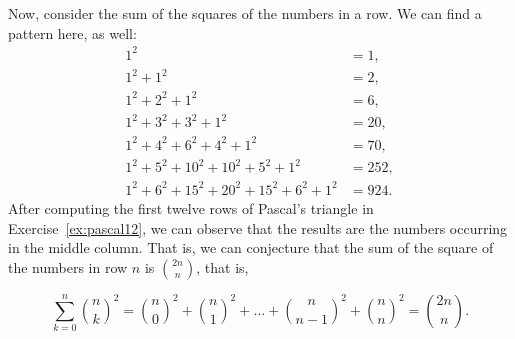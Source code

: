 Now, consider the sum of the squares of the numbers in a row. 
We can find a pattern here, as well: 
\begin{align*}
1^2 & = 1, \\
1^2 + 1^2 &= 2, \\
1^2 + 2^2 + 1^2 &= 6, \\
1^2 + 3^2 + 3^2 + 1^2 &= 20, \\
1^2 + 4^2 + 6^2 + 4^2 + 1^2 &= 70, \\
1^2 + 5^2 + 10^2 + 10^2 + 5^2 + 1^2 &= 252, \\
1^2 + 6^2 + 15^2 + 20^2 + 15^2 + 6^2 + 1^2 &= 924. 
\end{align*}
After computing the first twelve rows of Pascal's triangle in Exercise~\ref{ex:pascal12}, 
we can observe that the results are the numbers occurring in the middle column. 
That is, we can conjecture that the sum of the square of the numbers in row $n$ is $\binom{2n}{n}$, 
that is, 

\begin{proposition}\label{prop:sumsquaresofrow}
\begin{equation}\label{eq:sumsquaresofrow}
\sum_{k=0}^{n} \binom{n}{k}^2 = \binom{n}{0}^2 + \binom{n}{1}^2 + \dots + \binom{n}{n-1}^2 + \binom{n}{n}^2 = \binom{2n}{n}. 
\end{equation}
\end{proposition}

